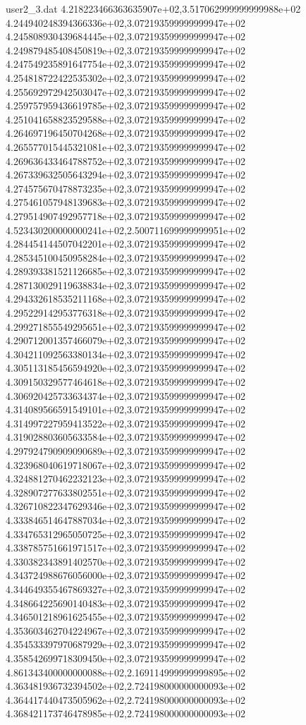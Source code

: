 \begin{filecontents}{user2_3.dat}
4.218223466363635907e+02,3.517062999999999988e+02
4.244940248394366336e+02,3.072193599999999947e+02
4.245808930439684445e+02,3.072193599999999947e+02
4.249879485408450819e+02,3.072193599999999947e+02
4.247549235891647754e+02,3.072193599999999947e+02
4.254818722422535302e+02,3.072193599999999947e+02
4.255692972942503047e+02,3.072193599999999947e+02
4.259757959436619785e+02,3.072193599999999947e+02
4.251041658823529588e+02,3.072193599999999947e+02
4.264697196450704268e+02,3.072193599999999947e+02
4.265577015445321081e+02,3.072193599999999947e+02
4.269636433464788752e+02,3.072193599999999947e+02
4.267339632505643294e+02,3.072193599999999947e+02
4.274575670478873235e+02,3.072193599999999947e+02
4.275461057948139683e+02,3.072193599999999947e+02
4.279514907492957718e+02,3.072193599999999947e+02
4.523430200000000241e+02,2.500711699999999951e+02
4.284454144507042201e+02,3.072193599999999947e+02
4.285345100450958284e+02,3.072193599999999947e+02
4.289393381521126685e+02,3.072193599999999947e+02
4.287130029119638834e+02,3.072193599999999947e+02
4.294332618535211168e+02,3.072193599999999947e+02
4.295229142953776318e+02,3.072193599999999947e+02
4.299271855549295651e+02,3.072193599999999947e+02
4.290712001357466079e+02,3.072193599999999947e+02
4.304211092563380134e+02,3.072193599999999947e+02
4.305113185456594920e+02,3.072193599999999947e+02
4.309150329577464618e+02,3.072193599999999947e+02
4.306920425733634374e+02,3.072193599999999947e+02
4.314089566591549101e+02,3.072193599999999947e+02
4.314997227959413522e+02,3.072193599999999947e+02
4.319028803605633584e+02,3.072193599999999947e+02
4.297924790909090689e+02,3.072193599999999947e+02
4.323968040619718067e+02,3.072193599999999947e+02
4.324881270462232123e+02,3.072193599999999947e+02
4.328907277633802551e+02,3.072193599999999947e+02
4.326710822347629346e+02,3.072193599999999947e+02
4.333846514647887034e+02,3.072193599999999947e+02
4.334765312965050725e+02,3.072193599999999947e+02
4.338785751661971517e+02,3.072193599999999947e+02
4.330382343891402570e+02,3.072193599999999947e+02
4.343724988676056000e+02,3.072193599999999947e+02
4.344649355467869327e+02,3.072193599999999947e+02
4.348664225690140483e+02,3.072193599999999947e+02
4.346501218961625455e+02,3.072193599999999947e+02
4.353603462704224967e+02,3.072193599999999947e+02
4.354533397970687929e+02,3.072193599999999947e+02
4.358542699718309450e+02,3.072193599999999947e+02
4.861343400000000088e+02,2.169114999999999895e+02
4.363481936732394502e+02,2.724198000000000093e+02
4.364417440473505962e+02,2.724198000000000093e+02
4.368421173746478985e+02,2.724198000000000093e+02

\end{filecontents}
